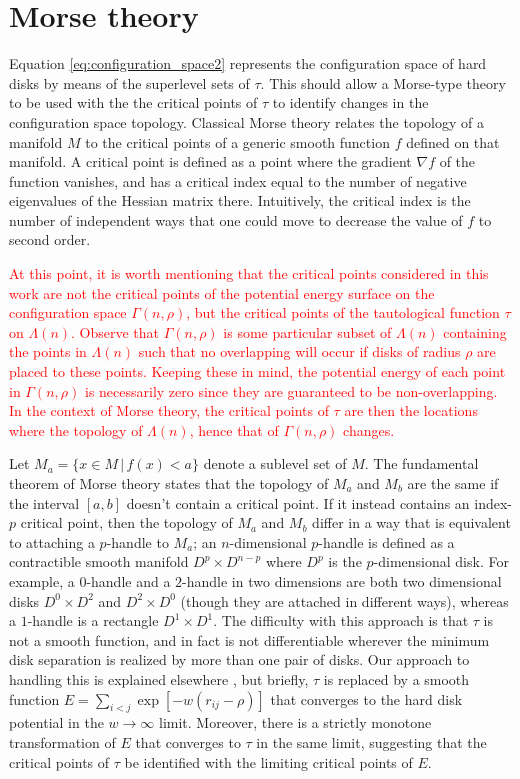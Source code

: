 \documentclass[default,iicol]{sn-jnl}%
\theoremstyle{thmstyleone}%
\theoremstyle{thmstyletwo}%
\theoremstyle{thmstylethree}%
\providecommand{\red}[1]{\textcolor{red}{#1}}
\begin{document}
\section{Morse theory}
\label{sec:morse_theory}

Equation \ref{eq:configuration_space2} represents the configuration space of hard disks by means of the superlevel sets of $\tau$. This should allow a Morse-type theory to be used with the the critical points of $\tau$ to identify changes in the configuration space topology. Classical Morse theory \cite{morse1934,milnor2016morse} relates the topology of a manifold $M$ to the critical points of a generic smooth function $f$ defined on that manifold. A critical point is defined as a point where the gradient $\nabla f$ of the function vanishes, and has a critical index equal to the number of negative eigenvalues of the Hessian matrix there. Intuitively, the critical index is the number of independent ways that one could move to decrease the value of $f$ to second order.

\red{At this point, it is worth mentioning that the critical points considered in this work are not the critical points of the potential energy surface on the configuration space $\Gamma(n,\rho)$, but the critical points of the tautological function $\tau$ on $\Lambda(n)$. Observe that $\Gamma(n,\rho)$ is some particular subset of $\Lambda(n)$ containing the points in $\Lambda(n)$ such that no overlapping will occur if disks of radius $\rho$ are placed to these points. Keeping these in mind, the potential energy of each point in $\Gamma(n,\rho)$ is necessarily zero since they are guaranteed to be non-overlapping. In the context of Morse theory, the critical points of $\tau$ are then the locations where the topology of $\Lambda(n)$, hence that of $\Gamma(n,\rho)$ changes.}

Let $M_a = \{x \in M \,\vert\, f(x) < a\}$ denote a sublevel set of $M$. The fundamental theorem of Morse theory states that the topology of $M_a$ and $M_b$ are the same if the interval $[a, b]$ doesn't contain a critical point. If it instead contains an index-$p$ critical point, then the topology of $M_a$ and $M_b$ differ in a way that is equivalent to attaching a $p$-handle to $M_a$; an $n$-dimensional $p$-handle is defined as a contractible smooth manifold $D^{p} \times D^{n-p}$ where $D^p$ is the $p$-dimensional disk. For example, a $0$-handle and a $2$-handle in two dimensions are both two dimensional disks $D^0 \times D^2$ and $D^2 \times D^0$ (though they are attached in different ways), whereas a $1$-handle is a rectangle $D^1 \times D^1$. The difficulty with this approach is that $\tau$ is not a smooth function, and in fact is not differentiable wherever the minimum disk separation is realized by more than one pair of disks. Our approach to handling this is explained elsewhere \cite{ritcheyphd}, but briefly, $\tau$ is replaced by a smooth function $E = \sum_{i < j} \exp[-w(r_{ij} - \rho)]$ that converges to the hard disk potential in the $w \rightarrow \infty$ limit. Moreover, there is a strictly monotone transformation of $E$ that converges to $\tau$ in the same limit, suggesting that the critical points of $\tau$ be identified with the limiting critical points of $E$.
\end{document}
